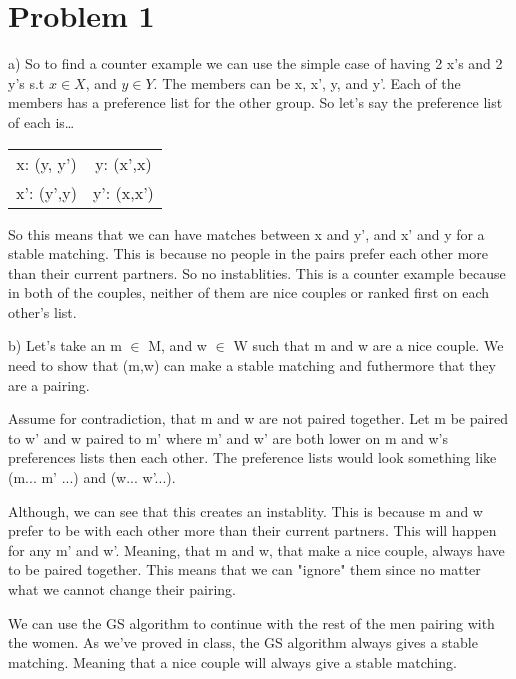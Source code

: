 \documentclass{article}
\begin{document}
\section{Problem 1}

a) So to find a counter example we can use the simple case of having 
2 x's and 2 y's s.t $x \in X$, and $y \in Y$. The members can be x, x', y, and y'. 
Each of the members has a preference list for the other group. 
So let's say the preference list of each is\dots

\begin{center}
    \begin{tabular}{ c c  }
        x: (y, y') & y: (x',x) \\ 
        x': (y',y) & y': (x,x')  \\     
    \end{tabular}
    \end{center}

So this means that we can have matches between x and y', and x' and y for a stable matching.
This is because no people in the pairs prefer each other more than their current partners. 
So no instablities. This is a counter example because in both of the couples, neither of them are nice couples or ranked first 
on each other's list. 
\vspace{3mm}

b) Let's take an m $\in$ M, and w $\in$ W such that m and w are a nice couple. We need to show that (m,w) can make a stable matching and futhermore that they are a pairing.
\vspace{1mm}

Assume for contradiction, that m and w are not paired together. Let m be paired to w' and w paired to m' where m' and w' are both lower on m and w's preferences lists then each other. 
The preference lists would look something like (m... m' ...) and (w... w'...). 
\vspace{1mm}

Although, we can see that this creates an instablity. This is because m and w prefer to be with each other more than their current partners. This will happen for any m' and w'. Meaning, that m and w, that make a nice couple,
always have to be paired together. This means that we can "ignore" them since no matter what we cannot change their pairing. 
\vspace{1mm}

We can use the GS algorithm to continue with the rest of the men pairing with the women. As we've proved in class, the GS algorithm always gives a stable matching. Meaning that a nice couple will always give a stable matching. 
\end{document}
